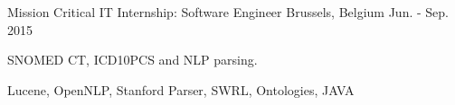\begin{cventries}
  \cventrysix%
    {Mission Critical IT} %
    {Internship: Software Engineer} %
    {Brussels, Belgium} %
    {Jun. - Sep. 2015} %
    {
      \begin{cvitems} %
        \item {SNOMED CT, ICD10PCS and NLP parsing.}
      \end{cvitems}
    }%
    {Lucene, OpenNLP, Stanford Parser, SWRL, Ontologies, JAVA}%










\end{cventries}

